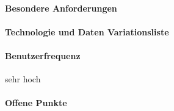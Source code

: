 \paragraph{Besondere Anforderungen}

\paragraph{Technologie und Daten Variationsliste}

\paragraph{Benutzerfrequenz}
sehr hoch

\paragraph{Offene Punkte}

\newpage

